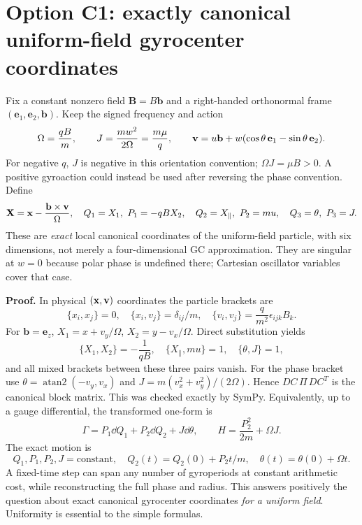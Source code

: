 \documentclass[10pt,a4paper]{article}
\newcommand{\B}{\mathbf B}\newcommand{\bunit}{\mathbf b}
\newcommand{\X}{\mathbf X}\newcommand{\n}{\mathbf n}
\begin{document}
\section{Option C1: exactly canonical uniform-field gyrocenter coordinates}
\label{sec:canonical}
Fix a constant nonzero field $\B=B\bunit$ and a right-handed orthonormal frame $(\mathbf e_1,\mathbf e_2,\bunit)$. Keep the signed frequency and action
\begin{equation}
 \Omega=\frac{qB}{m},\qquad
 J=\frac{m w^2}{2\Omega}=\frac{m\mu}{q},\qquad
 \v=u\bunit+w(\cos\theta\,\mathbf e_1-\sin\theta\,\mathbf e_2).
\end{equation}
For negative $q$, $J$ is negative in this orientation convention; $\Omega J=\mu B>0$. A positive gyroaction could instead be used after reversing the phase convention. Define
\begin{equation}\label{eq:uniformcenter}
 \X=\x-\frac{\bunit\times\v}{\Omega},\quad
 Q_1=X_1,\ P_1=-qB X_2,\quad
 Q_2=X_\parallel,\ P_2=m u,\quad Q_3=\theta,\ P_3=J.
\end{equation}
These are \emph{exact} local canonical coordinates of the uniform-field particle, with six dimensions, not merely a four-dimensional GC approximation. They are singular at $w=0$ because polar phase is undefined there; Cartesian oscillator variables cover that case.

\textbf{Proof.} In physical $(\mathbf x,\mathbf v)$ coordinates the particle brackets are
\begin{equation}
 \{x_i,x_j\}=0,\quad\{x_i,v_j\}=\delta_{ij}/m,
 \quad\{v_i,v_j\}=\frac q{m^2}\epsilon_{ijk}B_k.
\end{equation}
For $\bunit=\mathbf e_z$, $X_1=x+v_y/\Omega$, $X_2=y-v_x/\Omega$. Direct substitution yields
\begin{equation}
 \{X_1,X_2\}=-\frac1{qB},\quad
 \{X_\parallel,m u\}=1,\quad\{\theta,J\}=1,
\end{equation}
and all mixed brackets between these three pairs vanish. For the phase bracket use $\theta=\operatorname{atan2}(-v_y,v_x)$ and $J=m(v_x^2+v_y^2)/(2\Omega)$. Hence $D C\,\Pi\,D C^T$ is the canonical block matrix. This was checked exactly by SymPy. Equivalently, up to a gauge differential, the transformed one-form is
\begin{equation}\label{eq:canonicalaction}
 \Gamma=P_1\dd Q_1+P_2\dd Q_2+J\dd\theta,
 \qquad H=\frac{P_2^2}{2m}+\Omega J.
\end{equation}
The exact motion is
\begin{equation}
 Q_1,P_1,P_2,J=\text{constant},\quad
 Q_2(t)=Q_2(0)+P_2t/m,\quad\theta(t)=\theta(0)+\Omega t.
\end{equation}
A fixed-time step can span any number of gyroperiods at constant arithmetic cost, while reconstructing the full phase and radius. This answers positively the question about exact canonical gyrocenter coordinates \emph{for a uniform field}. Uniformity is essential to the simple formulas.
\end{document}

